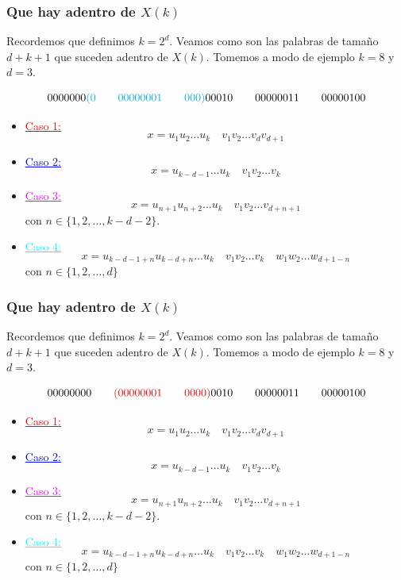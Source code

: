 \documentclass[10pt,mathserif]{beamer}%
\begin{document}
\begin{frame}
  \frametitle{Que hay adentro de $X(k)$}
  Recordemos que definimos $k = 2^d$.
  Veamos como son las palabras de tamaño $d + k + 1$ que suceden adentro de $X(k)$. Tomemos a modo de ejemplo $k = 8$ y $d = 3$.

  $$0000000\textcolor{cyan}{(0 \qquad 00000001 \qquad 000)}  00010 \qquad 00000011 \qquad 00000100$$

    \begin{itemize}
    \item \textcolor{red}{\underline{Caso 1:}}
    $$x = u_1 u_2 \dots u_k \quad v_1 v_2 \dots v_{d} v_{d + 1}$$  
    \item \textcolor{blue}{\underline{Caso 2:}}
    $$ x = u_{k-d-1} \dots u_k \quad v_1 v_2 \dots v_k$$
    \item \textcolor{magenta}{\underline{Caso 3:}}
    $$x = u_{n+1} u_{n+2} \dots u_k \quad  v_1 v_2 \dots v_{d+n+1} $$
    con $n \in \{1,2,\dots ,k - d - 2\}$.
    \item \textcolor{cyan}{\underline{Caso 4:}}
    $$ x = u_{k-d-1+n} u_{k-d+n} \dots u_k \quad v_1 v_2 \dots v_k \quad w_1 w_2 \dots w_{d+1-n}$$
    con $n \in \{1, 2, \dots , d\}$
  \end{itemize}
\end{frame}

\begin{frame}
  \frametitle{Que hay adentro de $X(k)$}
  Recordemos que definimos $k = 2^d$.
  Veamos como son las palabras de tamaño $d + k + 1$ que suceden adentro de $X(k)$. Tomemos a modo de ejemplo $k = 8$ y $d = 3$.

  $$00000000 \qquad \textcolor{red}{(00000001 \qquad 0000)} 0010 \qquad 00000011 \qquad 00000100 $$

    \begin{itemize}
    \item \textcolor{red}{\underline{Caso 1:}}
    $$x = u_1 u_2 \dots u_k \quad v_1 v_2 \dots v_{d} v_{d + 1}$$
    \item \textcolor{blue}{\underline{Caso 2:}}
    $$ x = u_{k-d-1} \dots u_k \quad v_1 v_2 \dots v_k$$
    \item \textcolor{magenta}{\underline{Caso 3:}}
    $$x = u_{n+1} u_{n+2} \dots u_k \quad  v_1 v_2 \dots v_{d+n+1} $$
    con $n \in \{1,2,\dots ,k - d - 2\}$.
    \item \textcolor{cyan}{\underline{Caso 4:}}
    $$ x = u_{k-d-1+n} u_{k-d+n} \dots u_k \quad v_1 v_2 \dots v_k \quad w_1 w_2 \dots w_{d+1-n}$$
    con $n \in \{1, 2, \dots , d\}$
  \end{itemize}
\end{frame} 
\end{document}
